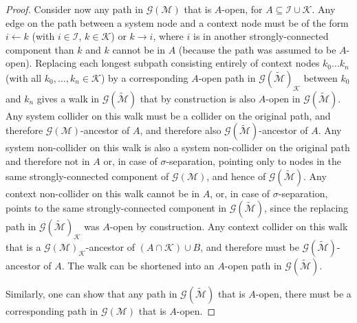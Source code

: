\documentclass[twoside,11pt]{article}
\newcommand{\Prb}{\mathbb{P}}
\newcommand\C[1]{\mathcal{#1}}
\newcommand\given{\,|\,}
\newcommand{\ot}{\leftarrow}
\newcommand{\Joris}[1]{{\color{blue}#1}}
\begin{document}
\begin{proof}
Consider now any path in $\C{G}(\C{M})$ that is $A$-open,
for $A \subseteq \C{I} \cup \C{K}$. Any edge on the path between a system node and a context node must
be of the form $i \ot k$ (with $i \in \C{I}$, $k \in \C{K}$) or $k \to i$, where $i$ is in another
strongly-connected component than $k$ and $k$ cannot be in $A$ (because the path was assumed to be $A$-open).
Replacing each longest subpath consisting entirely of context nodes $k_0 \dots k_n$ (with all $k_0, \dots, k_n \in \C{K}$) 
by a corresponding $A$-open path in $\C{G}(\tilde{\C{M}})_{\C{K}}$ between $k_0$ and $k_n$ 
gives a walk in $\C{G}(\tilde{\C{M}})$ that by construction is also $A$-open in $\C{G}(\tilde{\C{M}})$. 
Any system collider on this walk must be a collider on the original path, 
and therefore $\C{G}(\C{M})$-ancestor of $A$, and therefore also $\C{G}(\tilde{\C{M}})$-ancestor of $A$.
Any system non-collider on this walk is also a system non-collider on the original path and therefore not in $A$
or, in case of $\sigma$-separation, pointing only to nodes in the same strongly-connected component of $\C{G}(\C{M})$, 
and hence of $\C{G}(\tilde{\C{M}})$. 
Any context non-collider on this walk cannot be in $A$,
or, in case of $\sigma$-separation, points to the same strongly-connected component in $\C{G}(\tilde{\C{M}})$,
since the replacing path in $\C{G}(\tilde{\C{M}})_{\C{K}}$
was $A$-open by construction. Any context collider on this walk that is a $\C{G}(\C{M})_{\C{K}}$-ancestor of  
$(A \cap \C{K}) \cup B$, and therefore must be $\C{G}(\tilde{\C{M}})$-ancestor of $A$.
The walk can be shortened into an $A$-open path in $\C{G}(\tilde{\C{M}})$. 

Similarly, one can show that any path in $\C{G}(\tilde{\C{M}})$ that is $A$-open, there must be a
corresponding path in $\C{G}(\C{M})$ that is $A$-open.
\end{proof}
\end{document}
